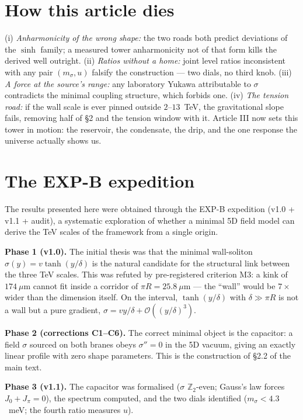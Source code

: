\section{How this article dies}
(i) \emph{Anharmonicity of the wrong shape:} the two roads both predict deviations of the $\sinh$ family; a measured tower anharmonicity not of that form kills the derived well outright. (ii) \emph{Ratios without a home:} joint level ratios inconsistent with any pair $(m_{\sigma},u)$ falsify the construction --- two dials, no third knob. (iii) \emph{A force at the source's range:} any laboratory Yukawa attributable to $\sigma$ contradicts the minimal coupling structure, which forbids one. (iv) \emph{The tension road:} if the wall scale is ever pinned outside $2$--$13$~TeV, the gravitational slope fails, removing half of \S2 and the tension window with it. Article III now sets this tower in motion: the reservoir, the condensate, the drip, and the one response the universe actually shows us.



\toolsstatement
{}

\appendix
\section{The EXP-B expedition}
The results presented here were obtained through the EXP-B expedition (v1.0 + v1.1 + audit), a systematic exploration of whether a minimal 5D field model can derive the TeV scales of the framework from a single origin.

\textbf{Phase 1 (v1.0).} The initial thesis was that the minimal wall-soliton $\sigma(y)=v\tanh(y/\delta)$ is the natural candidate for the structural link between the three TeV scales. This was refuted by pre-registered criterion M3: a kink of $174~\mu$m cannot fit inside a corridor of $\pi R=25.8~\mu$m --- the ``wall'' would be $7\times$ wider than the dimension itself. On the interval, $\tanh(y/\delta)$ with $\delta\gg\pi R$ is not a wall but a pure gradient, $\sigma=vy/\delta+\mathcal{O}((y/\delta)^{3})$.

\textbf{Phase 2 (corrections C1--C6).} The correct minimal object is the capacitor: a field $\sigma$ sourced on both branes obeys $\sigma''=0$ in the 5D vacuum, giving an exactly linear profile with zero shape parameters. This is the construction of \S2.2 of the main text.

\textbf{Phase 3 (v1.1).} The capacitor was formalised ($\sigma$ $\mathbb{Z}_2$-even; Gauss's law forces $J_{0}+J_{\pi}=0$), the spectrum computed, and the two dials identified ($m_\sigma<4.3$~meV; the fourth ratio measures $u$).

